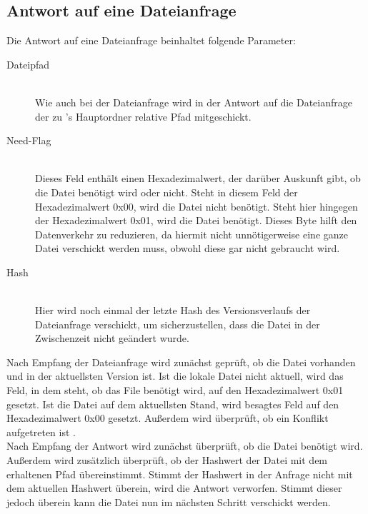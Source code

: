 \subsection{Antwort auf eine Dateianfrage}
Die Antwort auf eine Dateianfrage beinhaltet folgende Parameter: 
\begin{description}
	\item[{Dateipfad}] \hfill \\
		Wie auch bei der Dateianfrage wird in der Antwort auf die Dateianfrage der zu \sblit's Hauptordner relative Pfad mitgeschickt.
	\item[{Need-Flag}] \hfill \\
		Dieses Feld enthält einen Hexadezimalwert, der darüber Auskunft gibt, ob die Datei benötigt wird oder nicht. Steht in diesem Feld der Hexadezimalwert 0x00, wird die Datei nicht benötigt. Steht hier hingegen der Hexadezimalwert 0x01, wird die Datei benötigt. Dieses Byte hilft den Datenverkehr zu reduzieren, da hiermit nicht unnötigerweise eine ganze Datei verschickt werden muss, obwohl diese gar nicht gebraucht wird.
	\item[{Hash}] \hfill \\
		Hier wird noch einmal der letzte Hash des Versionsverlaufs der Dateianfrage verschickt, um sicherzustellen, dass die Datei in der Zwischenzeit nicht geändert wurde. 
\end{description}
Nach Empfang der Dateianfrage wird zunächst geprüft, ob die Datei vorhanden und in der aktuellsten Version ist.  Ist die lokale Datei nicht aktuell, wird das Feld, in dem steht, ob das File benötigt wird, auf den Hexadezimalwert 0x01 gesetzt. Ist die Datei auf dem aktuellsten Stand, wird besagtes Feld auf den Hexadezimalwert 0x00 gesetzt. Außerdem wird überprüft, ob ein Konflikt aufgetreten ist .\\
Nach Empfang der Antwort wird zunächst überprüft, ob die Datei benötigt wird. Außerdem wird zusätzlich überprüft, ob der Hashwert der Datei mit dem erhaltenen Pfad übereinstimmt. Stimmt der Hashwert in der Anfrage nicht mit dem aktuellen Hashwert überein, wird die Antwort verworfen. Stimmt dieser jedoch überein kann die Datei nun im nächsten Schritt verschickt werden.
		
